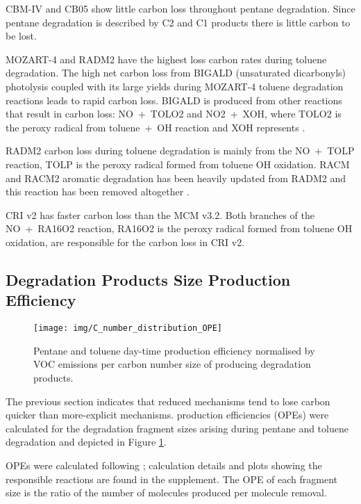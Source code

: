 CBM-IV and CB05 show little carbon loss throughout pentane degradation.
Since pentane degradation is described by C2 and C1 products there is little carbon to be lost.

MOZART-4 and RADM2 have the highest loss carbon rates during toluene degradation.
The high net carbon loss from BIGALD (unsaturated dicarbonyls) photolysis coupled with its large yields during MOZART-4 toluene degradation reactions leads to rapid carbon loss.
BIGALD is produced from other reactions that result in carbon loss: \mbox{NO + TOLO2} and \mbox{NO2 + XOH}, where TOLO2 is the peroxy radical from \mbox{toluene + OH} reaction and XOH represents  \citep{Emmons:2010}.

RADM2 carbon loss during toluene degradation is mainly from the \mbox{NO + TOLP} reaction, TOLP is the peroxy radical formed from toluene OH oxidation.
RACM and RACM2 aromatic degradation has been heavily updated from RADM2 and this reaction has been removed altogether \citep{Stockwell:1997, Goliff:2013}.

CRI v2 has faster carbon loss than the MCM v3.2.
Both branches of the \mbox{NO + RA16O2} reaction, RA16O2 is the peroxy radical formed from toluene OH oxidation, are responsible for the carbon loss in CRI v2.

\subsection[Degradation Products Size Ox Production Efficiency]{Degradation Products Size  Production Efficiency} \label{ss:OPE}

\begin{figure}
    \centering
    \texttt{[image: img/C\_number\_distribution\_OPE]}
    \vspace{0mm}
    \caption{Pentane and toluene day-time  production efficiency normalised by VOC emissions per carbon number size of  producing degradation products.}
    \vspace{-4mm}
    \label{f:OPE}
\end{figure}

The previous section indicates that reduced mechanisms tend to lose carbon quicker than more-explicit mechanisms.
 production efficiencies (OPEs) were calculated for the degradation fragment sizes arising during pentane and toluene degradation and depicted in Figure \ref{f:OPE}.

OPEs were calculated following \citet{Kleinman:2002}; calculation details and plots showing the responsible reactions are found in the supplement.
The OPE of each fragment size is the ratio of the number of  molecules produced per  molecule removal.

